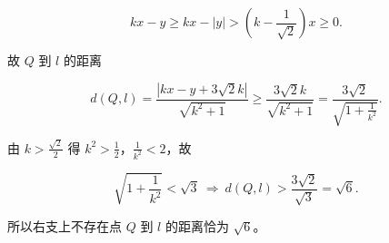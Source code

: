 \begin{answer}
\nopagebreak[4]
\[kx-y\geqslant kx-|y|>\left(k-\frac1{\sqrt2}\right)x\geqslant0 .\]

故 $Q$ 到 $l$ 的距离

\nopagebreak[4]
\[d(Q,l)=\frac{|kx-y+3\sqrt2k|}{\sqrt{k^2+1}}
\geqslant\frac{3\sqrt2k}{\sqrt{k^2+1}}
=\frac{3\sqrt2}{\sqrt{1+\frac1{k^2}}} .\]

由 $k>\frac{\sqrt2}{2}$ 得 $k^2>\frac12$，$\frac1{k^2}<2$，故

\nopagebreak[4]
\[\sqrt{1+\frac1{k^2}}<\sqrt3
\ \Longrightarrow\ d(Q,l)>\frac{3\sqrt2}{\sqrt3}=\sqrt6 .\]

所以右支上不存在点 $Q$ 到 $l$ 的距离恰为 $\sqrt6$。


\end{answer}

